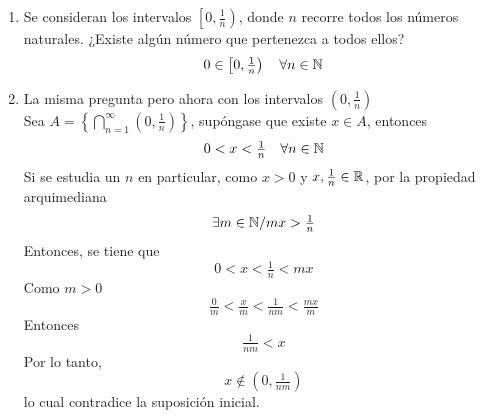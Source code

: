 \item \begin{enumerate}
        \item Se consideran los intervalos $\left[0,\tfrac{1}{n}\right)$, donde $n$ recorre todos los números naturales. ¿Existe algún número que pertenezca a todos ellos?
            \[0\in\left[0,\tfrac{1}{n}\right)\quad\forall n\in\mathbb{N}\]
        \item La misma pregunta pero ahora con los intervalos $\left(0,\tfrac{1}{n}\right)$\e\\
            Sea $A=\left\{\bigcap\limits_{n=1}^\infty\left(0,\tfrac{1}{n}\right)\right\}$, supóngase que existe $x\in A$, entonces
            \[0<x<\tfrac{1}{n}\quad\forall n\in\mathbb{N}\]
            Si se estudia un $n$ en particular, como $x>0$ y $x,\tfrac{1}{n}\in\mathbb{R}$, por la propiedad arquimediana
            \[\exists m\in\mathbb{N}/mx>\tfrac{1}{n}\]
            Entonces, se tiene que\[0<x<\tfrac{1}{n}<mx\]
            Como $m>0$\[\tfrac{0}{m}<\tfrac{x}{m}<\tfrac{1}{nm}<\tfrac{mx}{m}\]
            Entonces \[\tfrac{1}{nm}<x\]
            Por lo tanto,\[x\notin\left(0,\tfrac{1}{nm}\right)\]
            lo cual contradice la suposición inicial.
    \end{enumerate}